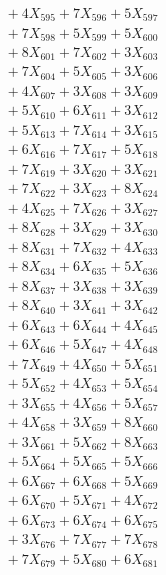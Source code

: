 \documentclass[a4paper,10pt]{article}
\begin{document}
{\begin{align}
&\;  + 4 X_{595} + 7 X_{596} + 5 X_{597} \\[0.3ex]
&\;  + 7 X_{598} + 5 X_{599} + 5 X_{600} \\[0.3ex]
&\;  + 8 X_{601} + 7 X_{602} + 3 X_{603} \\[0.3ex]
&\;  + 7 X_{604} + 5 X_{605} + 3 X_{606} \\[0.3ex]
&\;  + 4 X_{607} + 3 X_{608} + 3 X_{609} \\[0.5ex]\allowbreak
&\;  + 5 X_{610} + 6 X_{611} + 3 X_{612} \\[0.3ex]
&\;  + 5 X_{613} + 7 X_{614} + 3 X_{615} \\[0.3ex]
&\;  + 6 X_{616} + 7 X_{617} + 5 X_{618} \\[0.3ex]
&\;  + 7 X_{619} + 3 X_{620} + 3 X_{621} \\[0.3ex]
&\;  + 7 X_{622} + 3 X_{623} + 8 X_{624} \\[0.3ex]
&\;  + 4 X_{625} + 7 X_{626} + 3 X_{627} \\[0.3ex]
&\;  + 8 X_{628} + 3 X_{629} + 3 X_{630} \\[0.3ex]
&\;  + 8 X_{631} + 7 X_{632} + 4 X_{633} \\[0.3ex]
&\;  + 8 X_{634} + 6 X_{635} + 5 X_{636} \\[0.3ex]
&\;  + 8 X_{637} + 3 X_{638} + 3 X_{639} \\[0.5ex]\allowbreak
&\;  + 8 X_{640} + 3 X_{641} + 3 X_{642} \\[0.3ex]
&\;  + 6 X_{643} + 6 X_{644} + 4 X_{645} \\[0.3ex]
&\;  + 6 X_{646} + 5 X_{647} + 4 X_{648} \\[0.3ex]
&\;  + 7 X_{649} + 4 X_{650} + 5 X_{651} \\[0.3ex]
&\;  + 5 X_{652} + 4 X_{653} + 5 X_{654} \\[0.3ex]
&\;  + 3 X_{655} + 4 X_{656} + 5 X_{657} \\[0.3ex]
&\;  + 4 X_{658} + 3 X_{659} + 8 X_{660} \\[0.3ex]
&\;  + 3 X_{661} + 5 X_{662} + 8 X_{663} \\[0.3ex]
&\;  + 5 X_{664} + 5 X_{665} + 5 X_{666} \\[0.3ex]
&\;  + 6 X_{667} + 6 X_{668} + 5 X_{669} \\[0.5ex]\allowbreak
&\;  + 6 X_{670} + 5 X_{671} + 4 X_{672} \\[0.3ex]
&\;  + 6 X_{673} + 6 X_{674} + 6 X_{675} \\[0.3ex]
&\;  + 3 X_{676} + 7 X_{677} + 7 X_{678} \\[0.3ex]
&\;  + 7 X_{679} + 5 X_{680} + 6 X_{681} \\[0.3ex]

\end{align}}
\end{document}

